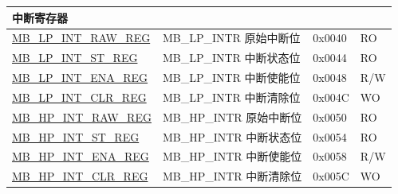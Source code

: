 \begin{longtable}{ | p{6cm} | p{7.2cm} | p{1.3cm} | p{1cm} | }
\multicolumn{4}{|l|}{\textbf{中断寄存器}} \\ \hline
\hyperref[regdesc:MBLPINTRAWREG]{MB\_LP\_INT\_RAW\_REG} & MB\_LP\_INTR 原始中断位& 0x0040 & RO \\ \hline
\hyperref[regdesc:MBLPINTSTREG]{MB\_LP\_INT\_ST\_REG} & MB\_LP\_INTR 中断状态位& 0x0044 & RO \\ \hline
\hyperref[regdesc:MBLPINTENAREG]{MB\_LP\_INT\_ENA\_REG} & MB\_LP\_INTR 中断使能位& 0x0048 & R/W \\ \hline
\hyperref[regdesc:MBLPINTCLRREG]{MB\_LP\_INT\_CLR\_REG} & MB\_LP\_INTR 中断清除位& 0x004C & WO \\ \hline
\hyperref[regdesc:MBHPINTRAWREG]{MB\_HP\_INT\_RAW\_REG} & MB\_HP\_INTR 原始中断位& 0x0050 & RO \\ \hline
\hyperref[regdesc:MBHPINTSTREG]{MB\_HP\_INT\_ST\_REG} & MB\_HP\_INTR 中断状态位& 0x0054 & RO \\ \hline
\hyperref[regdesc:MBHPINTENAREG]{MB\_HP\_INT\_ENA\_REG} & MB\_HP\_INTR 中断使能位& 0x0058 & R/W \\ \hline
\hyperref[regdesc:MBHPINTCLRREG]{MB\_HP\_INT\_CLR\_REG} & MB\_HP\_INTR 中断清除位& 0x005C & WO \\ \hline
\end{longtable}

